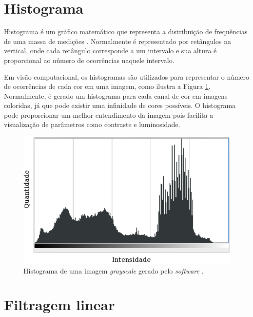 
\section{Histograma} %
\label{sec:histograma}

Histograma é um gráfico matemático que representa a distribuição de frequências de uma massa de medições \citep{lancaster1973introduction}. Normalmente é representado por retângulos na vertical, onde cada retângulo corresponde a um intervalo e sua altura é proporcional ao número de ocorrências naquele intervalo.

Em visão computacional, os histogramas são utilizados para representar o número de ocorrências de cada cor em uma imagem, como ilustra a Figura \ref{fig:histograma}. Normalmente, é gerado um histograma para cada canal de cor em imagens coloridas, já que pode existir uma infinidade de cores possíveis. O histograma pode proporcionar um melhor entendimento da imagem pois facilita a visualização de parâmetros como contraste e luminosidade.

\begin{figure}[ht]
  \begin{center}
    \includegraphics[scale=.55]{imgs/histograma.png}
  \end{center}
  \caption{Histograma de uma imagem \textit{grayscale} gerado pelo \textit{software} \cite{gimp:2013:online}.}
  \label{fig:histograma}
\end{figure}


\section{Filtragem linear} %
\label{sec:filtragem_linear}

